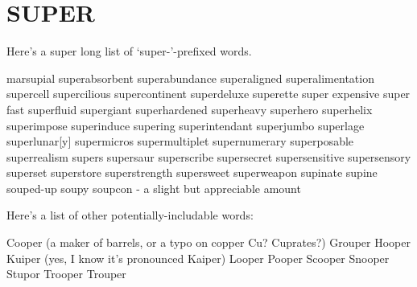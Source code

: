 \section{SUPER}
Here's a super long list of `super-'-prefixed words.

marsupial
superabsorbent
superabundance
superaligned
superalimentation
supercell
supercilious
supercontinent
superdeluxe
superette
super expensive
super fast
superfluid
supergiant
superhardened
superheavy
superhero
superhelix
superimpose
superinduce
supering
superintendant
superjumbo
superlage
superlunar[y]
supermicros
supermultiplet
supernumerary
superposable
superrealism
supers
supersaur
superscribe
supersecret
supersensitive
supersensory
superset
superstore
superstrength
supersweet
superweapon
supinate
supine
souped-up
soupy
soupcon - a slight but appreciable amount

Here's a list of other potentially-includable words:

Cooper (a maker of barrels, or a typo on copper Cu?  Cuprates?)
Grouper
Hooper
Kuiper (yes, I know it's pronounced Kaiper)
Looper
Pooper
Scooper
Snooper
Stupor
Trooper
Trouper
